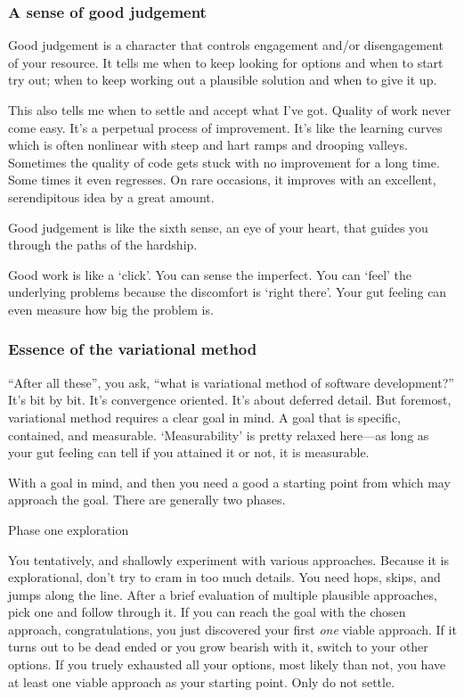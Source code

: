\documentclass[oneside,11pt]{book}
\theoremstyle{definition}
\theoremstyle{remark}
\begin{document}
\subsubsection{A sense of good judgement}

Good judgement is a character that controls engagement and/or disengagement of your resource.
It tells me when to keep looking for options and when to start try out;
when to keep working out a plausible solution and when to give it up.

This also tells me when to settle and accept what I've got.
Quality of work never come easy.
It's a perpetual process of improvement.
It's like the learning curves which is often nonlinear with steep and hart ramps and drooping
valleys.
Sometimes the quality of code gets stuck with no improvement for a long time.
Some times it even regresses.
On rare occasions, it improves with an excellent, serendipitous idea by a great amount.

Good judgement is like the sixth sense, an eye of your heart, that guides you through the paths of
the hardship.

Good work is like a `click'.
You can sense the imperfect.
You can `feel' the underlying problems because the discomfort is `right there'.
Your gut feeling can even measure how big the problem is.

\subsubsection{Essence of the variational method}
``After all these'', you ask, ``what is variational method of software development?''
It's bit by bit.
It's convergence oriented.
It's about deferred detail.
But foremost, variational method requires a clear goal in mind.
A goal that is specific, contained, and measurable.
`Measurability' is pretty relaxed here---as long as your gut feeling can tell if you attained it
or not, it is measurable.

With a goal in mind, and then you need a good a starting point from which may approach the goal.
There are generally two phases.

Phase one exploration

You tentatively, and shallowly experiment with various approaches.
Because it is explorational, don't try to cram in too much details.
You need hops, skips, and jumps along the line.
After a brief evaluation of multiple plausible approaches, pick one and follow through it.
If you can reach the goal with the chosen approach, congratulations, you just discovered your first
\emph{one} viable approach.
If it turns out to be dead ended or you grow bearish with it, switch to your other options.
If you truely exhausted all your options, most likely than not, you have at least one viable
approach as your starting point.
Only do not settle.
\end{document}
